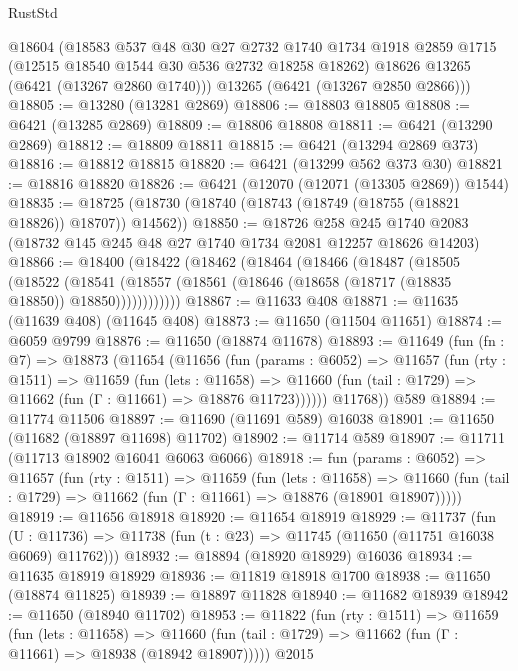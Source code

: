 \begin{lexlean}{RustStd}
\begin{coremodule}
      @18604
      (@18583
        @537
        @48
        @30
        @27
        @2732
        @1740
        @1734
        @1918
        @2859
        @1715
        (@12515 @18540 @1544 @30 @536 @2732 @18258 @18262)
        @18626
        @13265
        (@6421 (@13267 @2860 @1740)))
      @13265
      (@6421 (@13267 @2850 @2866)))
@18805 := @13280 (@13281 @2869)
@18806 := @18803 @18805
@18808 := @6421 (@13285 @2869)
@18809 := @18806 @18808
@18811 := @6421 (@13290 @2869)
@18812 := @18809 @18811
@18815 := @6421 (@13294 @2869 @373)
@18816 := @18812 @18815
@18820 := @6421 (@13299 @562 @373 @30)
@18821 := @18816 @18820
@18826 := @6421 (@12070 (@12071 (@13305 @2869)) @1544)
@18835 := @18725 (@18730 (@18740 (@18743 (@18749 (@18755 (@18821 @18826)) @18707)) @14562))
@18850 := @18726
    @258
    @245
    @1740
    @2083
    (@18732 @145 @245 @48 @27 @1740 @1734 @2081 @12257 @18626 @14203)
@18866 := @18400
    (@18422
      (@18462
        (@18464
          (@18466
            (@18487
              (@18505
                (@18522
                  (@18541
                    (@18557 (@18561 (@18646 (@18658 (@18717 (@18835 @18850)) @18850))))))))))))
@18867 := @11633 @408
@18871 := @11635 (@11639 @408) (@11645 @408)
@18873 := @11650 (@11504 @11651)
@18874 := @6059 @9799
@18876 := @11650 (@18874 @11678)
@18893 := @11649
    (fun (fn : @7) =>
    @18873
      (@11654
        (@11656
          (fun (params : @6052) =>
          @11657
            (fun (rty : @1511) =>
            @11659
              (fun (lets : @11658) =>
              @11660 (fun (tail : @1729) => @11662 (fun (Γ : @11661) => @18876 @11723))))))
        @11768))
    @589
@18894 := @11774 @11506
@18897 := @11690 (@11691 @589) @16038
@18901 := @11650 (@11682 (@18897 @11698) @11702)
@18902 := @11714 @589
@18907 := @11711 (@11713 @18902 @16041 @6063 @6066)
@18918 := fun (params : @6052) =>
  @11657
    (fun (rty : @1511) =>
    @11659
      (fun (lets : @11658) =>
      @11660 (fun (tail : @1729) => @11662 (fun (Γ : @11661) => @18876 (@18901 @18907)))))
@18919 := @11656 @18918
@18920 := @11654 @18919
@18929 := @11737
    (fun (U : @11736) => @11738 (fun (t : @23) => @11745 (@11650 (@11751 @16038 @6069) @11762)))
@18932 := @18894 (@18920 @18929) @16036
@18934 := @11635 @18919 @18929
@18936 := @11819 @18918 @1700
@18938 := @11650 (@18874 @11825)
@18939 := @18897 @11828
@18940 := @11682 @18939
@18942 := @11650 (@18940 @11702)
@18953 := @11822
    (fun (rty : @1511) =>
    @11659
      (fun (lets : @11658) =>
      @11660 (fun (tail : @1729) => @11662 (fun (Γ : @11661) => @18938 (@18942 @18907)))))
    @2015

\end{coremodule}
\end{lexlean}
